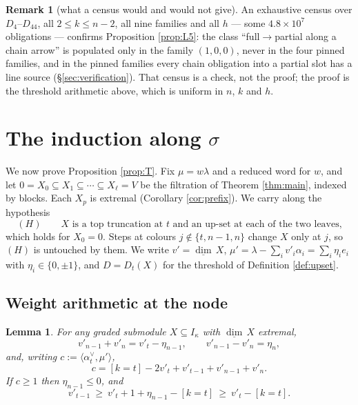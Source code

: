 \documentclass[reqno]{amsart}
\theoremstyle{plain}
\newtheorem{lemma}[theorem]{Lemma}
\theoremstyle{definition}
\newtheorem{remark}[theorem]{Remark}
\newcommand{\dimv}{\underline{\dim}\,}
\newcommand{\la}{\lambda}
\newcommand{\al}{\alpha}
\newcommand{\ka}{\kappa}
\begin{document}
\begin{remark}[what a census would and would not give]\label{rem:L5census}
An exhaustive census over $D_4$--$D_{44}$, all $2\le k\le n-2$, all nine
families and all $h$ --- some $4.8\times10^{7}$ obligations --- confirms
Proposition \ref{prop:L5}: the class ``full$\to$partial along a chain arrow''
is populated only in the family $(1,0,0)$, never in the four pinned families,
and in the pinned families every chain obligation into a partial slot has a
line source (\S\ref{sec:verification}).  That census is a check, not the
proof; the proof is the threshold arithmetic above, which is uniform in $n$,
$k$ and $h$.
\end{remark}


\section{The induction along \texorpdfstring{$\sigma$}{sigma}}
\label{sec:induction}

We now prove Proposition \ref{prop:T}.  Fix $\mu=w\la$ and a reduced word for
$w$, and let $0=X_0\subseteq X_1\subseteq\cdots\subseteq X_\ell=V$ be the
filtration of Theorem \ref{thm:main}, indexed by blocks.  Each $X_p$ is
extremal (Corollary \ref{cor:prefix}).  We carry along the hypothesis
\[
   (H)\qquad
   X \text{ is a top truncation at } t \text{ and an up-set at each of the two
   leaves,}
\]
which holds for $X_0=0$.  Steps at colours $j\notin\{t,n-1,n\}$ change $X$ only
at $j$, so $(H)$ is untouched by them.  We write
$v'=\dimv X$, $\mu'=\la-\sum_iv'_i\al_i=\sum_i\eta_ie_i$ with
$\eta_i\in\{0,\pm1\}$, and $D=D_t(X)$ for the threshold of Definition
\ref{def:upset}.

\subsection{Weight arithmetic at the node}

\begin{lemma}\label{lem:B0}
For any graded submodule $X\subseteq I_\ka$ with $\dimv X$ extremal,
\[
   v'_{n-1}+v'_n=v'_t-\eta_{n-1},
   \qquad
   v'_{n-1}-v'_n=\eta_n,
\]
and, writing $c:=\langle\al_t^\vee,\mu'\rangle$,
\[
   c=[k=t]-2v'_t+v'_{t-1}+v'_{n-1}+v'_n .
\]
If $c\ge1$ then $\eta_{n-1}\le 0$, and
\begin{equation}\label{eq:B1}
   v'_{t-1}\ \ge\ v'_t+1+\eta_{n-1}-[k=t]\ \ge\ v'_t-[k=t].
\end{equation}
\end{lemma}
\end{document}
